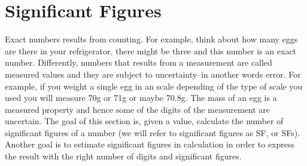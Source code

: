 \documentclass[main.tex]{subfiles}
\begin{document}
\section{Significant Figures}
Exact numbers results from counting. For example, think about how many eggs are there in your refrigerator, there might be three and this number is an exact number.
Differently, numbers that results from a measurement are called measured values and they are subject to uncertainty--in another words error.  For example, if you weight a single egg in an scale depending of the type of scale you used you will measure 70g or 71g or maybe 70.8g. The mass of an egg is a measured property and hence some of the digits of the measurement are uncertain. The goal of this section is, given a value, calculate the number of significant figures of a number (we will refer to significant figures as SF, or SFs). Another goal is to estimate significant figures in calculation in order to express the result with the right number of digits and significant figures.
\end{document}
